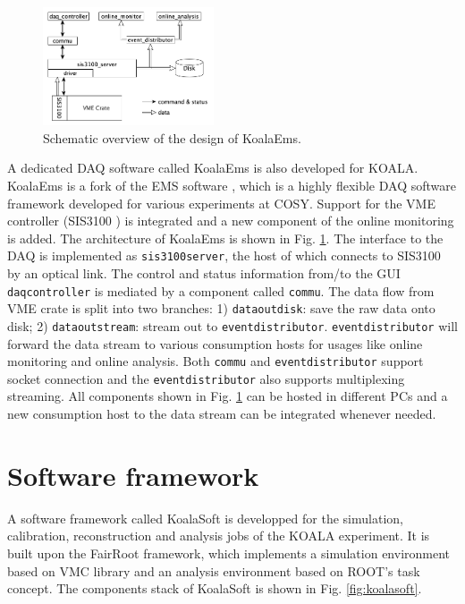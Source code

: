 \documentclass[number,5p]{elsarticle}
\begin{document}
\begin{figure}[htbp]
\centering
\includegraphics[width=0.45\textwidth]{./koalaems_deployment.png}
\caption{Schematic overview of the design of KoalaEms.}
\label{fig:koalaems}
\end{figure}

A dedicated DAQ software called KoalaEms is also developed for KOALA.
KoalaEms is a fork of the EMS software \cite{ems}, which is a highly flexible DAQ software framework developed for various experiments at COSY.
Support for the VME controller (SIS3100 \cite{sis}) is integrated and a new
component of the online monitoring is added.
The architecture of KoalaEms is shown in Fig. \ref{fig:koalaems}.
The interface to the DAQ is implemented as \linebreak\texttt{sis3100\textunderscore server}, the host of which
connects to SIS3100 by an optical link.
The control and status information from/to the GUI \texttt{daq\textunderscore controller} is mediated by a component called \texttt{commu}.
The data flow from VME crate is split into two branches: 1) \texttt{data\textunderscore out\textunderscore disk}: save the raw data onto disk; 2) \texttt{data\textunderscore out\textunderscore stream}: stream out to \texttt{event\textunderscore distributor}.
\texttt{event\textunderscore distributor} will forward the data stream to various consumption hosts for usages like online monitoring and online analysis.
Both \texttt{commu} and \texttt{event\textunderscore distributor} support socket connection and the \texttt{event\textunderscore distributor} also supports multiplexing streaming.
All components shown in Fig. \ref{fig:koalaems} can be hosted in different PCs
and a new consumption host to the data stream can be integrated whenever needed.

\section{Software framework}
\label{sec:software}

A software framework called KoalaSoft is developped for the simulation, calibration, reconstruction and analysis jobs of the KOALA experiment.
It is built upon the FairRoot \cite{fairroot} framework, which implements a simulation environment based on VMC \cite{vmc} library and an analysis environment based on ROOT's task concept.
The components stack of KoalaSoft is shown in Fig. \ref{fig:koalasoft}.
\end{document}
